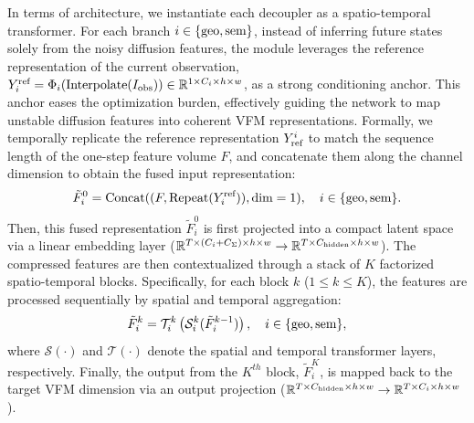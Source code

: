 \documentclass[runningheads]{llncs}
\begin{document}
In terms of architecture, we instantiate each decoupler as a spatio-temporal transformer. For each branch $i \in \{\textnormal{geo}, \textnormal{sem}\}$, instead of inferring future states solely from the noisy diffusion features, the module leverages the reference representation of the current observation, $Y_{i}^{\textnormal{ref}} = \Phi_{i}(\textnormal{Interpolate}(I_\textnormal{obs}))\in\mathbb{R}^{1\times{C_i}\times h \times w}$, as a strong conditioning anchor. This anchor eases the optimization burden, effectively guiding the network to map unstable diffusion features into coherent VFM representations.
Formally, we temporally replicate the reference representation $Y_{\textnormal{ref}}^{i}$ to match the sequence length of the one-step feature volume $F$, and concatenate them along the channel dimension to obtain the fused input representation:
\begin{equation}
    \tilde{F}_i^0 = \text{Concat}((F, \text{Repeat}(Y_{i}^{\textnormal{ref}})), \text{dim}=1), \quad i \in \{\textnormal{geo}, \textnormal{sem}\}. 
\end{equation}
Then, this fused representation $\tilde{F}_i^0$ is first projected into a compact latent space via a linear embedding layer ($\mathbb{R}^{T\times (C_{i}+C_{\Sigma}) \times h \times w} \rightarrow \mathbb{R}^{T\times C_\textnormal{hidden} \times h \times w}$). The compressed features are then contextualized through a stack of $K$ factorized spatio-temporal blocks. Specifically, for each block $k$ ($1 \le k \le K$), the features are processed sequentially by spatial and temporal aggregation:
\begin{equation}
    \tilde{F}_i^k = \mathcal{T}_i^k \left( \mathcal{S}_i^k ( \tilde{F}_i^{k-1} ) \right), \quad i \in \{\textnormal{geo}, \textnormal{sem}\},
\end{equation}
where $\mathcal{S}(\cdot)$ and $\mathcal{T}(\cdot)$ denote the spatial and temporal transformer layers, respectively. Finally, the output from the $K^{th}$ block, $\tilde{F}_i^K$, is mapped back to the target VFM dimension via an output projection ($\mathbb{R}^{T\times C_\textnormal{hidden} \times h \times w} \rightarrow \mathbb{R}^{T\times C_i \times h \times w}$).
\end{document}
